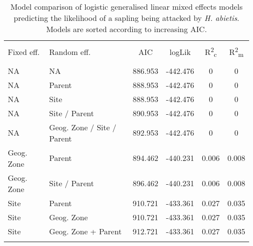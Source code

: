 
\begin{table}[!htbp] \centering 
  \caption{Model comparison of logistic generalised linear mixed effects models predicting the likelihood of a sapling being attacked by \textit{H. abietis}. Models are sorted according to increasing AIC.} 
  \label{binom_comp} 
\begin{tabular}{@{\extracolsep{5pt}} llS[table-format=3.2]S[table-format=3.2]S[table-format=3.2]S[table-format=3.2]} 
\\[-1.8ex]\hline 
\hline \\[-1.8ex] 
{Fixed eff.} & {Random eff.} & {AIC} & {logLik} & {R\textsuperscript{2}\textsubscript{c}} & {R\textsuperscript{2}\textsubscript{m}} \\
\hline \\[-1.8ex] 
NA & NA & 886.953 & -442.476 & 0 & 0 \\ 
NA & Parent & 888.953 & -442.476 & 0 & 0 \\ 
NA & Site & 888.953 & -442.476 & 0 & 0 \\ 
NA & Site / Parent & 890.953 & -442.476 & 0 & 0 \\ 
NA & Geog. Zone / Site / Parent & 892.953 & -442.476 & 0 & 0 \\ 
Geog. Zone & Parent & 894.462 & -440.231 & 0.006 & 0.008 \\ 
Geog. Zone & Site / Parent & 896.462 & -440.231 & 0.006 & 0.008 \\ 
Site & Parent & 910.721 & -433.361 & 0.027 & 0.035 \\ 
Site & Geog. Zone & 910.721 & -433.361 & 0.027 & 0.035 \\ 
Site & Geog. Zone + Parent & 912.721 & -433.361 & 0.027 & 0.035 \\ 
\hline \\[-1.8ex] 
\end{tabular} 
\end{table} 
